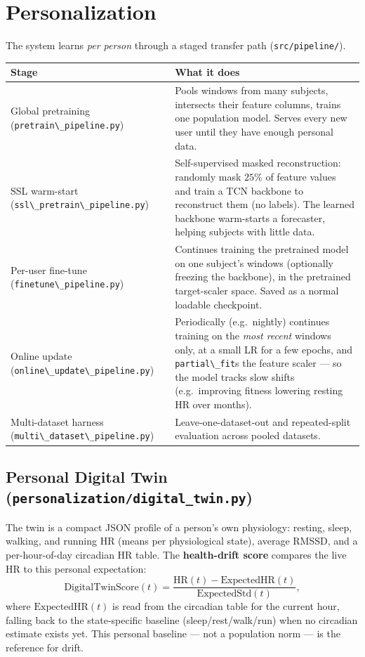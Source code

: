 \documentclass[11pt,a4paper]{article}
\newcommand{\code}[1]{\lstinline[basicstyle=\ttfamily\normalsize]!#1!}
\begin{document}
\section{Personalization}\label{sec:personal}

The system learns \emph{per person} through a staged transfer path
(\code{src/pipeline/}).

\begin{longtable}{@{}p{}p{}@{}}
\toprule
\textbf{Stage} & \textbf{What it does} \\
\midrule
\endhead
Global pretraining (\code{pretrain\_pipeline.py}) & Pools windows from many
subjects, intersects their feature columns, trains one population model. Serves
every new user until they have enough personal data. \\
SSL warm-start (\code{ssl\_pretrain\_pipeline.py}) & Self-supervised masked
reconstruction: randomly mask $25\%$ of feature values and train a TCN backbone
to reconstruct them (no labels). The learned backbone warm-starts a forecaster,
helping subjects with little data. \\
Per-user fine-tune (\code{finetune\_pipeline.py}) & Continues training the
pretrained model on one subject's windows (optionally freezing the backbone),
in the pretrained target-scaler space. Saved as a normal loadable checkpoint. \\
Online update (\code{online\_update\_pipeline.py}) & Periodically (e.g.\ nightly)
continues training on the \emph{most recent} windows only, at a small LR for a
few epochs, and \code{partial\_fit}s the feature scaler --- so the model tracks
slow shifts (e.g.\ improving fitness lowering resting HR over months). \\
Multi-dataset harness (\code{multi\_dataset\_pipeline.py}) & Leave-one-dataset-out
and repeated-split evaluation across pooled datasets. \\
\bottomrule
\end{longtable}

\subsection{Personal Digital Twin (\texttt{personalization/digital\_twin.py})}
The twin is a compact JSON profile of a person's own physiology: resting, sleep,
walking, and running HR (means per physiological state), average RMSSD, and a
per-hour-of-day circadian HR table. The \textbf{health-drift score} compares the
live HR to this personal expectation:
\[
\text{DigitalTwinScore}(t)=\frac{\text{HR}(t)-\text{ExpectedHR}(t)}{\text{ExpectedStd}(t)},
\]
where $\text{ExpectedHR}(t)$ is read from the circadian table for the current
hour, falling back to the state-specific baseline (sleep/rest/walk/run) when no
circadian estimate exists yet. This personal baseline --- not a population norm
--- is the reference for drift.
\end{document}
